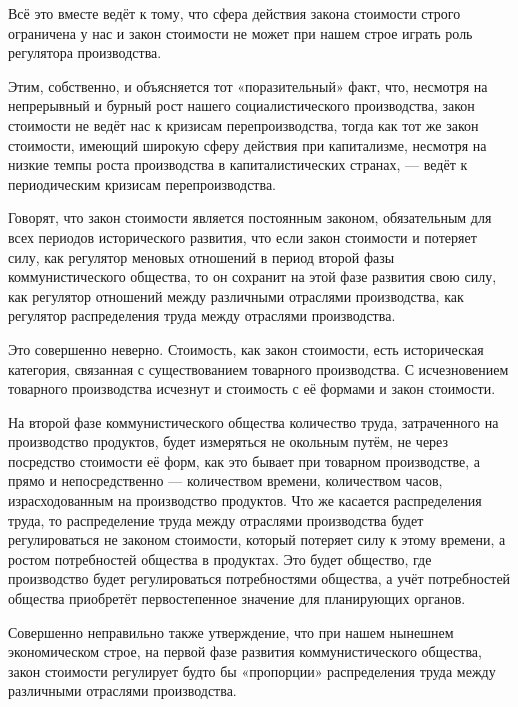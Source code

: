 \documentclass[12pt, a4paper, openany]{book}
\begin{document}
Всё это вместе ведёт к тому, что сфера действия закона стоимости строго ограничена у нас и закон стоимости не может при нашем строе играть роль регулятора производства.



Этим, собственно, и объясняется тот «поразительный» факт, что, несмотря на непрерывный и бурный рост нашего социалистического производства, закон стоимости не ведёт нас к кризисам перепроизводства, тогда как тот же закон стоимости, имеющий широкую сферу действия при капитализме, несмотря на низкие темпы роста производства в капиталистических странах, — ведёт к периодическим кризисам перепроизводства.



Говорят, что закон стоимости является постоянным законом, обязательным для всех периодов исторического развития, что если закон стоимости и потеряет силу, как регулятор меновых отношений в период второй фазы коммунистического общества, то он сохранит на этой фазе развития свою силу, как регулятор отношений между различными отраслями производства, как регулятор распределения труда между отраслями производства.



Это совершенно неверно. Стоимость, как закон стоимости, есть историческая категория, связанная с существованием товарного производства. С исчезновением товарного производства исчезнут и стоимость с её формами и закон стоимости.



На второй фазе коммунистического общества количество труда, затраченного на производство продуктов, будет измеряться не окольным путём, не через посредство стоимости её форм, как это бывает при товарном производстве, а прямо и непосредственно — количеством времени, количеством часов, израсходованным на производство продуктов. Что же касается распределения труда, то распределение труда между отраслями производства будет регулироваться не законом стоимости, который потеряет силу к этому времени, а ростом потребностей общества в продуктах. Это будет общество, где производство будет регулироваться потребностями общества, а учёт потребностей общества приобретёт первостепенное значение для планирующих органов.



Совершенно неправильно также утверждение, что при нашем нынешнем экономическом строе, на первой фазе развития коммунистического общества, закон стоимости регулирует будто бы «пропорции» распределения труда между различными отраслями производства.
\end{document}
